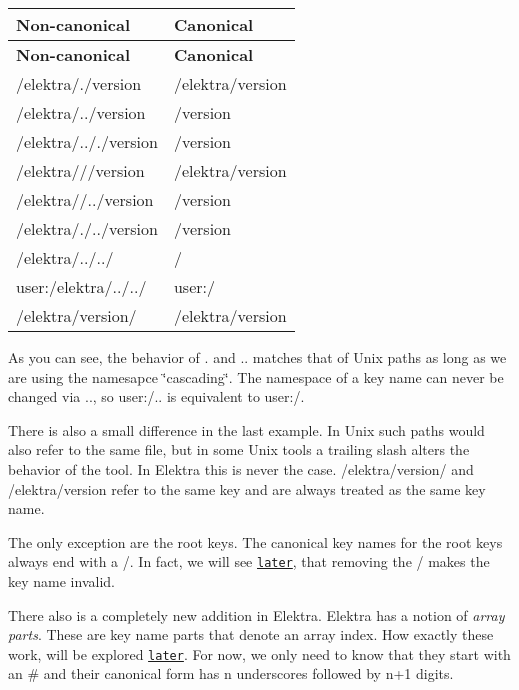 \tabulinesep=1mm
\begin{longtabu} spread 0pt [c]{*{2}{|X[-1]}|}
\hline
\rowcolor{\tableheadbgcolor}\textbf{ Non-\/canonical }&\textbf{ Canonical  }\\
\endfirsthead
\hline
\endfoot
\hline
\rowcolor{\tableheadbgcolor}\textbf{ Non-\/canonical }&\textbf{ Canonical  }\\
\endhead
{\ttfamily /elektra/./version} &{\ttfamily /elektra/version} \\
{\ttfamily /elektra/../version} &{\ttfamily /version} \\
{\ttfamily /elektra/.././version} &{\ttfamily /version} \\
{\ttfamily /elektra///version} &{\ttfamily /elektra/version} \\
{\ttfamily /elektra//../version} &{\ttfamily /version} \\
{\ttfamily /elektra/./../version} &{\ttfamily /version} \\
{\ttfamily /elektra/../../} &{\ttfamily /} \\
{\ttfamily user\+:/elektra/../../} &{\ttfamily user\+:/} \\
{\ttfamily /elektra/version/} &{\ttfamily /elektra/version} \\
\end{longtabu}
As you can see, the behavior of {\ttfamily .} and {\ttfamily ..} matches that of Unix paths as long as we are using the namesapce \char`\"{}cascading\char`\"{}. The namespace of a key name can never be changed via {\ttfamily ..}, so {\ttfamily user\+:/..} is equivalent to {\ttfamily user\+:/}.

There is also a small difference in the last example. In Unix such paths would also refer to the same file, but in some Unix tools a trailing slash alters the behavior of the tool. In Elektra this is never the case. {\ttfamily /elektra/version/} and {\ttfamily /elektra/version} refer to the same key and are always treated as the same key name.

The only exception are the root keys. The canonical key names for the root keys always end with a {\ttfamily /}. In fact, we will see \href{#4-valid-and-invalid-key-names}{\tt later}, that removing the {\ttfamily /} makes the key name invalid.

There also is a completely new addition in Elektra. Elektra has a notion of {\itshape array parts}. These are key name parts that denote an array index. How exactly these work, will be explored \href{#4-valid-and-invalid-key-names}{\tt later}. For now, we only need to know that they start with an {\ttfamily \#} and their canonical form has {\ttfamily n} underscores followed by {\ttfamily n+1} digits.

